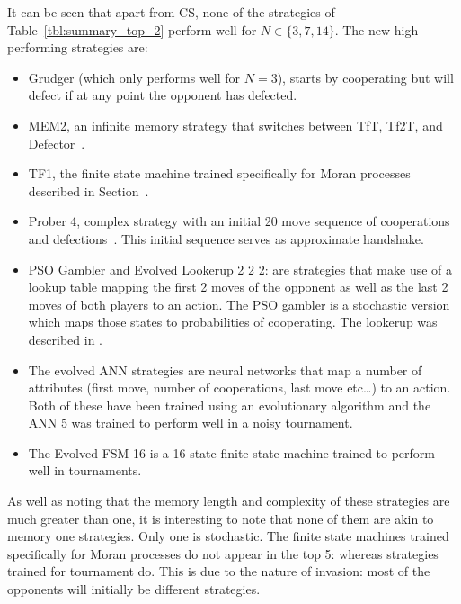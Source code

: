 \documentclass{article}
\begin{document}
It can be seen that apart from CS, none of the strategies
of Table~\ref{tbl:summary_top_2} perform well for \(N\in\{3, 7, 14\}\). The new
high performing strategies are:

\begin{itemize}
    \item Grudger (which only performs well for \(N=3\)), starts by cooperating
        but will defect if at any point the opponent has defected.
    \item MEM2, an infinite memory strategy that switches between TfT, Tf2T, and
        Defector~\cite{Li2014}.
    \item TF1, the finite state machine trained specifically for Moran processes
        described in Section~\cite{sec:introduction}.
    \item Prober 4, complex strategy with an initial 20 move sequence of
        cooperations and defections~\cite{prison}. This initial sequence serves
        as approximate handshake.
    \item  PSO Gambler and Evolved Lookerup 2 2 2: are strategies that make use
        of a lookup table mapping the first 2 moves of the opponent as well as
        the last 2 moves of both players to an action. The PSO gambler is a
        stochastic version which maps those states to probabilities of
        cooperating. The lookerup was described in \cite{Knight2016}.
	\item The evolved ANN strategies are neural networks that map a number of
		attributes (first move, number of cooperations, last move etc\dots) to
		an action. Both of these have been trained using an evolutionary
		algorithm and the ANN 5 was trained to perform well in a noisy
		tournament.
    \item The Evolved FSM 16 is a 16 state finite state machine trained to
        perform well in tournaments.
\end{itemize}

As well as noting that the memory length and complexity of these strategies are
much greater than one, it is interesting to note that none of them are akin to
memory one strategies. Only one is stochastic. The finite state machines trained
specifically for Moran processes do not appear in the top 5: whereas strategies
trained for tournament do. This is due to the nature of invasion: most of the
opponents will initially be different strategies.
\end{document}
